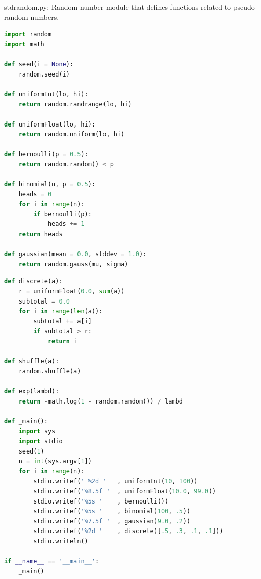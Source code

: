 \documentclass[8pt,a4paper,compress]{beamer}
\begin{document}
\begin{frame}[fragile]
\pause

\begin{framed}
\tiny stdrandom.py: Random number module that defines functions related to pseudo-random numbers.
\end{framed}

\begin{lstlisting}[language=Python]
import random
import math

def seed(i = None):
    random.seed(i)

def uniformInt(lo, hi):
    return random.randrange(lo, hi)
    
def uniformFloat(lo, hi):
    return random.uniform(lo, hi)

def bernoulli(p = 0.5):
    return random.random() < p

def binomial(n, p = 0.5):
    heads = 0
    for i in range(n):
        if bernoulli(p):
            heads += 1
    return heads
    
def gaussian(mean = 0.0, stddev = 1.0):
    return random.gauss(mu, sigma)
\end{lstlisting}
\end{frame}

\begin{frame}[fragile]
\pause

\begin{lstlisting}[language=Python]
def discrete(a):
    r = uniformFloat(0.0, sum(a))
    subtotal = 0.0
    for i in range(len(a)):
        subtotal += a[i]
        if subtotal > r:
            return i

def shuffle(a):
    random.shuffle(a)

def exp(lambd):
    return -math.log(1 - random.random()) / lambd
    
def _main():
    import sys
    import stdio
    seed(1)
    n = int(sys.argv[1])
    for i in range(n):
        stdio.writef(' %2d '   , uniformInt(10, 100))
        stdio.writef('%8.5f '  , uniformFloat(10.0, 99.0))
        stdio.writef('%5s '    , bernoulli())
        stdio.writef('%5s '    , binomial(100, .5))
        stdio.writef('%7.5f '  , gaussian(9.0, .2))
        stdio.writef('%2d '    , discrete([.5, .3, .1, .1]))
        stdio.writeln()

if __name__ == '__main__':
    _main()
\end{lstlisting}
\end{frame}
\end{document}
